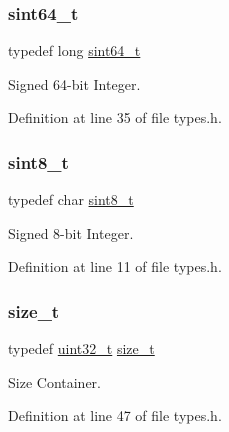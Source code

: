 \subsubsection{\texorpdfstring{sint64\+\_\+t}{sint64\_t}}
{\footnotesize\ttfamily typedef long \hyperlink{a00035_a04761b9e7480e1e48b0d392da17fd5d4_a04761b9e7480e1e48b0d392da17fd5d4}{sint64\+\_\+t}}



Signed 64-\/bit Integer. 



Definition at line 35 of file types.\+h.

\mbox{\label{a00035_afa23178c4119f09bd4562a86b501f444_afa23178c4119f09bd4562a86b501f444}} 
\subsubsection{\texorpdfstring{sint8\+\_\+t}{sint8\_t}}
{\footnotesize\ttfamily typedef char \hyperlink{a00035_afa23178c4119f09bd4562a86b501f444_afa23178c4119f09bd4562a86b501f444}{sint8\+\_\+t}}



Signed 8-\/bit Integer. 



Definition at line 11 of file types.\+h.

\mbox{\label{a00035_a29d85914ddff32967d85ada69854206d_a29d85914ddff32967d85ada69854206d}} 
\subsubsection{\texorpdfstring{size\+\_\+t}{size\_t}}
{\footnotesize\ttfamily typedef \hyperlink{a00035_a435d1572bf3f880d55459d9805097f62_a435d1572bf3f880d55459d9805097f62}{uint32\+\_\+t} \hyperlink{a00035_a29d85914ddff32967d85ada69854206d_a29d85914ddff32967d85ada69854206d}{size\+\_\+t}}



Size Container. 



Definition at line 47 of file types.\+h.

\mbox{\label{a00035_a273cf69d639a59973b6019625df33e30_a273cf69d639a59973b6019625df33e30}} 
